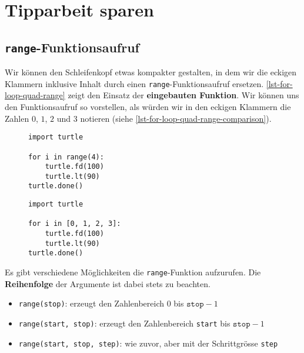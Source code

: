 \section{Tipparbeit sparen}

\subsection{\lstinline{range}-Funktionsaufruf}

Wir können den Schleifenkopf etwas kompakter gestalten, in dem wir die eckigen Klammern inklusive Inhalt durch einen \lstinline{range}-Funktionsaufruf ersetzen. \autoref{lst-for-loop-quad-range} zeigt den Einsatz der \textbf{eingebauten Funktion}. Wir können uns den Funktionsaufruf so vorstellen, als würden wir in den eckigen Klammern die Zahlen $0$, $1$, $2$ und $3$ notieren (siehe \autoref{lst-for-loop-quad-range-comparison}).

\begin{figure}[htb]
\centering
\begin{minipage}{0.45\textwidth}
\centering
	\begin{lstlisting}[caption={\graybgtexttt{quadrat\_loop\_range.py}}, label={lst-for-loop-quad-range}]
import turtle

for i in range(4):
    turtle.fd(100)
    turtle.lt(90)
turtle.done()
\end{lstlisting}
\end{minipage}
\hfill
\begin{minipage}{0.45\textwidth}
\centering
\begin{lstlisting}[caption={\graybgtexttt{quadrat\_loop.py}}, label={lst-for-loop-quad-range-comparison}]
import turtle

for i in [0, 1, 2, 3]:
    turtle.fd(100)
    turtle.lt(90)
turtle.done()
\end{lstlisting}
\end{minipage}
\end{figure}

\vspace{-0.25cm}

Es gibt verschiedene Möglichkeiten die \lstinline{range}-Funktion aufzurufen. Die \textbf{Reihenfolge} der Argumente ist dabei stets zu beachten.

\begin{itemize}
	\item \lstinline{range(stop)}: erzeugt den Zahlenbereich $0$ bis $\texttt{stop}-1$
	\item \lstinline{range(start, stop)}: erzeugt den Zahlenbereich \lstinline{start} bis $\texttt{stop}-1$
	\item \lstinline{range(start, stop, step)}: wie zuvor, aber mit der Schrittgrösse \lstinline{step}
\end{itemize}

